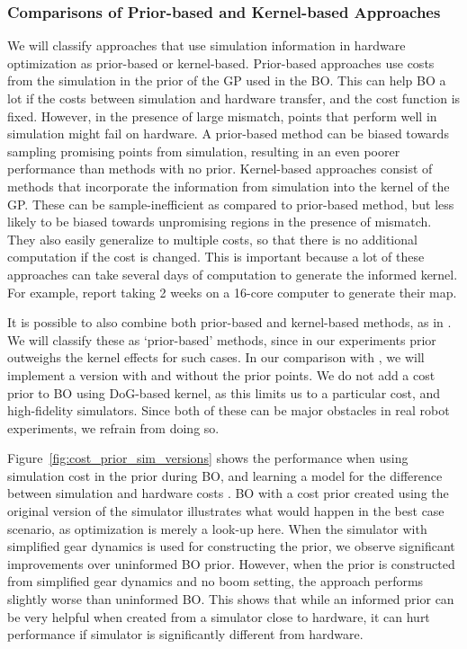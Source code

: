 \subsubsection{Comparisons of Prior-based and Kernel-based Approaches}
\label{subsec:sim_experiments_prior_cully}
We will classify approaches that use simulation information in hardware optimization as prior-based or kernel-based. Prior-based approaches use costs from the simulation in the prior of the GP used in the BO. This can help BO a lot if the costs between simulation and hardware transfer, and the cost function is fixed. However, in the presence of large mismatch, points that perform well in simulation might fail on hardware. A prior-based method can be biased towards sampling promising points from simulation, resulting in an even poorer performance than methods with no prior. Kernel-based approaches consist of methods that incorporate the information from simulation into the kernel of the GP. These can be sample-inefficient as compared to prior-based method, but less likely to be biased towards unpromising regions in the presence of mismatch. They also easily generalize to multiple costs, so that there is no additional computation if the cost is changed. This is important because a lot of these approaches can take several days of computation to generate the informed kernel. For example, \cite{cully2015robots} report taking 2 weeks on a 16-core computer to generate their map. 

It is possible to also combine both prior-based and kernel-based methods, as in \cite{cully2015robots}. We will classify these as `prior-based' methods, since in our experiments prior outweighs the kernel effects for such cases. In our comparison with \cite{cully2015robots}, we will implement a version with and without the prior points. We do not add a cost prior to BO using DoG-based kernel, as this limits us to a particular cost, and high-fidelity simulators. Since both of these can be major obstacles in real robot experiments, we refrain from doing so.


Figure~\ref{fig:cost_prior_sim_versions} shows the performance when using simulation cost in the prior during BO, and learning a model for the difference between simulation and hardware costs \citep{wilson2014using}. BO with a cost prior created using the original version of the simulator illustrates what would happen in the best case scenario, as optimization is merely a look-up here. When the simulator with simplified gear dynamics is used for constructing the prior, we observe significant improvements over uninformed BO prior. However, when the prior is constructed from simplified gear dynamics and no boom setting, the approach performs slightly worse than uninformed BO. This shows that while an informed prior can be very helpful when created from a simulator close to hardware, it can hurt performance if simulator is significantly different from hardware. 

